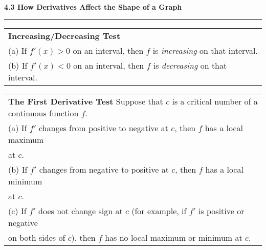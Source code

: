 \documentclass{article}
\begin{document}
\begin{center}
\Large\textbf{4.3 How Derivatives Affect the Shape of a Graph}

\noindent\hfill\rule{0.3\textwidth}{.4pt}\hfill
\vspace{24pt}

\large
\def\arraystretch{1.3}
{\setlength{\tabcolsep}{16pt}
\begin{tabularx}{.9\textwidth}{|X|}
\hline
	\textbf{Increasing/Decreasing Test} \\
	(a) If $f'(x) > 0$ on an interval, then $f$ is \textit{increasing} on that interval. \\
	(b) If $f'(x) < 0$ on an interval, then $f$ is \textit{decreasing} on that interval. \\

\hline
\end{tabularx}}
\vspace{16pt}

\large
\def\arraystretch{1.3}
{\setlength{\tabcolsep}{16pt}
\begin{tabularx}{.9\textwidth}{|X|}
\hline
	\textbf{The First Derivative Test} \: Suppose that $c$ is a critical number of a continuous function $f$. \\
	
	(a) If $f'$ changes from positive to negative at $c$, then $f$ has a local maximum \\ \hspace{16pt} at $c$. \\
	(b) If $f'$ changes from negative to positive at $c$, then $f$ has a local minimum \\ \hspace{16pt} at $c$. \\
	(c) If $f'$ does not change sign at $c$ (for example, if $f'$ is positive or negative \\ \hspace{16pt} on both sides of $c$), then $f$ has no local maximum or minimum at $c$. \\  
\hline
\end{tabularx}}
\vspace{16pt}
\end{center}
\end{document}
